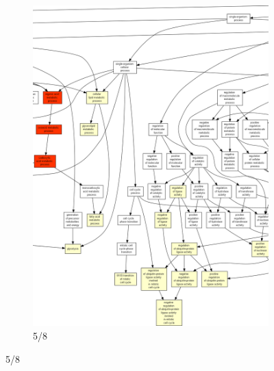 \begin{figure}[p]
\ContinuedFloat
\begin{subfigure}{\textwidth}
\includegraphics[width=\textwidth]
{Figures/hlc-go-all-graph/hlc-go-all-graph_4.png}
\caption{5/8}
\end{subfigure}
\end{figure}

